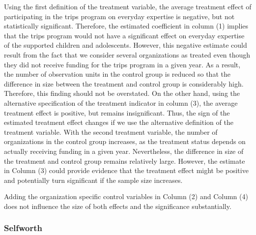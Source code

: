 \documentclass[12pt, a4paper, titlepage]{article}\usepackage[]{graphicx}\usepackage[]{color}
\begin{document}
Using the first definition of the treatment variable, the average treatment effect of participating in the trips program on everyday expertise is negative, but not statistically significant. Therefore, the estimated coefficient in column (1) implies that the trips program would not have a significant effect on everyday expertise of the supported children and adolescents. However, this negative estimate could result from the fact that we consider several organizations as treated even though they did not receive funding for the trips program in a given year. As a result, the number of observation units in the control group is reduced so that the difference in size between the treatment and control group is considerably high. Therefore, this finding should not be overstated. On the other hand, using the alternative specification of the treatment indicator in column (3), the average treatment effect is positive, but remains insignificant. Thus, the sign of the estimated treatment effect changes if we use the alternative definition of the treatment variable. With the second treatment variable, the number of organizations in the control group increases, as the treatment status depends on actually receiving funding in a given year. Nevertheless, the difference in size of the treatment and control group remains relatively large. However, the estimate in Column (3) could provide evidence that the treatment effect might be positive and potentially turn significant if the sample size increases.

Adding the organization specific control variables in Column (2) and Column (4) does not influence the size of both effects and the significance substantially.

\subsubsection{Selfworth}
\end{document}
